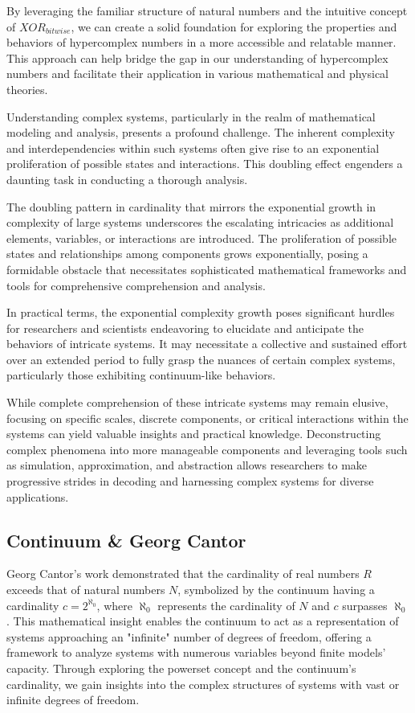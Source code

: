 \documentclass{article}
\begin{document}
By leveraging the familiar structure of natural numbers and the intuitive concept of $XOR_{bitwise}$, we can create a solid foundation for exploring the properties and behaviors of hypercomplex numbers in a more accessible and relatable manner. This approach can help bridge the gap in our understanding of hypercomplex numbers and facilitate their application in various mathematical and physical theories.

Understanding complex systems, particularly in the realm of mathematical modeling and analysis, presents a profound challenge. The inherent complexity and interdependencies within such systems often give rise to an exponential proliferation of possible states and interactions. This doubling effect engenders a daunting task in conducting a thorough analysis.

The doubling pattern in cardinality that mirrors the exponential growth in complexity of large systems underscores the escalating intricacies as additional elements, variables, or interactions are introduced. The proliferation of possible states and relationships among components grows exponentially, posing a formidable obstacle that necessitates sophisticated mathematical frameworks and tools for comprehensive comprehension and analysis.

In practical terms, the exponential complexity growth poses significant hurdles for researchers and scientists endeavoring to elucidate and anticipate the behaviors of intricate systems. It may necessitate a collective and sustained effort over an extended period to fully grasp the nuances of certain complex systems, particularly those exhibiting continuum-like behaviors.

While complete comprehension of these intricate systems may remain elusive, focusing on specific scales, discrete components, or critical interactions within the systems can yield valuable insights and practical knowledge. Deconstructing complex phenomena into more manageable components and leveraging tools such as simulation, approximation, and abstraction allows researchers to make progressive strides in decoding and harnessing complex systems for diverse applications.

\subsection{Continuum \& Georg Cantor}\label{cantor}
Georg Cantor's work demonstrated that the cardinality of real numbers $R$ exceeds that of natural numbers $N$, symbolized by the continuum having a cardinality
 $c = 2^{\aleph_0}$, where $\aleph_0$ represents the cardinality of $N$ and $c$ surpasses $\aleph_0$. This mathematical insight enables the continuum to act as a representation of systems approaching an "infinite" number of degrees of freedom, offering a framework to analyze systems with numerous variables beyond finite models' capacity. Through exploring the powerset concept and the continuum's cardinality, we gain insights into the complex structures of systems with vast or infinite degrees of freedom.
\end{document}
